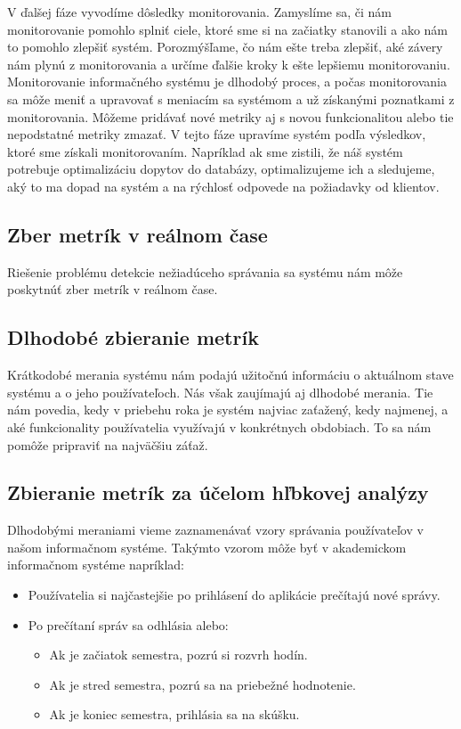 \documentclass[a4paper, usesections, upjsfrontpage, disablespecwarning, thesismargins, thesislinespacing]{rnthesissvk}
\begin{document}
V ďalšej fáze vyvodíme dôsledky monitorovania.
Zamyslíme sa, či nám monitorovanie pomohlo splniť ciele, ktoré sme si na začiatky stanovili a ako nám to pomohlo zlepšiť systém.
Porozmýšľame, čo nám ešte treba zlepšiť, aké závery nám plynú z monitorovania a určíme ďalšie kroky k ešte lepšiemu monitorovaniu.
Monitorovanie informačného systému je dlhodobý proces, a počas monitorovania sa môže meniť a upravovať s meniacím sa systémom a už získanými poznatkami z monitorovania.
Môžeme pridávať nové metriky aj s novou funkcionalitou alebo tie nepodstatné metriky zmazať.
V tejto fáze upravíme systém podľa výsledkov, ktoré sme získali monitorovaním.
Napríklad ak sme zistili, že náš systém potrebuje optimalizáciu dopytov do databázy, optimalizujeme ich a sledujeme, aký to ma dopad na systém a na rýchlosť odpovede na požiadavky od klientov.

\subsection{Zber metrík v reálnom čase}

Riešenie problému detekcie nežiadúceho správania sa systému nám môže poskytnúť zber metrík v reálnom čase.


\subsection{Dlhodobé zbieranie metrík}

Krátkodobé merania systému nám podajú užitočnú informáciu o aktuálnom stave systému a o jeho používateľoch.
Nás však zaujímajú aj dlhodobé merania.
Tie nám povedia, kedy v priebehu roka je systém najviac zaťažený, kedy najmenej, a aké funkcionality používatelia využívajú v konkrétnych obdobiach.
To sa nám pomôže pripraviť na najväčšiu záťaž.

\subsection{Zbieranie metrík za účelom hľbkovej analýzy}

Dlhodobými meraniami vieme zaznamenávať vzory správania používateľov v našom informačnom systéme.
Takýmto vzorom môže byť v akademickom informačnom systéme napríklad:

\begin{itemize}
	\item Používatelia si najčastejšie po prihlásení do aplikácie prečítajú nové správy.
	\item Po prečítaní správ sa odhlásia alebo:
	\begin{itemize}
		\item Ak je začiatok semestra, pozrú si rozvrh hodín.
		\item Ak je stred semestra, pozrú sa na priebežné hodnotenie.
		\item Ak je koniec semestra, prihlásia sa na skúšku.
	\end{itemize}
\end{itemize}
\end{document}
